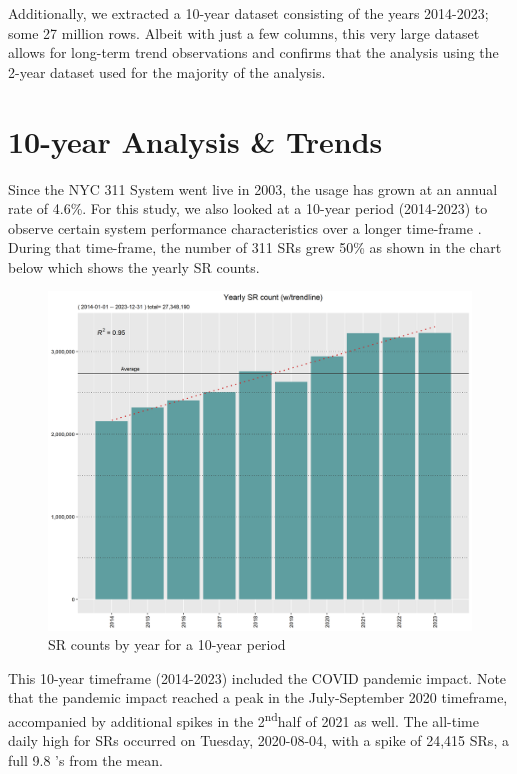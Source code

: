 \documentclass[12pt, titlepage]{article}
\begin{document}
Additionally, we extracted a 10-year dataset consisting of the years 2014-2023; some 27 million rows. Albeit with just a few columns, 
this very large dataset allows for long-term trend observations and confirms that the analysis using the 
2-year dataset used for the majority of the analysis.

\section{10-year Analysis \& Trends} \label{sec:history}

Since the NYC 311 System went live in 2003, the usage has grown at an annual
rate of 4.6\%. For this study, we also looked at a 10-year period (2014-2023) to
observe certain system performance characteristics over a longer time-frame . 
During that time-frame, the number of 311 SRs grew 50\% as shown in the chart below which shows the yearly SR counts.

\begin{figure}[htbp]
  \centering
  \includegraphics[scale=0.65]{Yearly.png}
  \caption{SR counts by year for a 10-year period}
  \label{fig:yearly-counts}
\end{figure}

This 10-year timeframe (2014-2023) included the COVID pandemic impact. Note that the pandemic
impact reached a peak in the July-September 2020 timeframe, accompanied by additional spikes
in the 2\textsuperscript{nd}half of 2021 as well. The all-time daily high for SRs occurred on Tuesday, 2020-08-04, with a spike of
24,415 SRs, a full 9.8 \textsigma's from the mean. 
\end{document}

